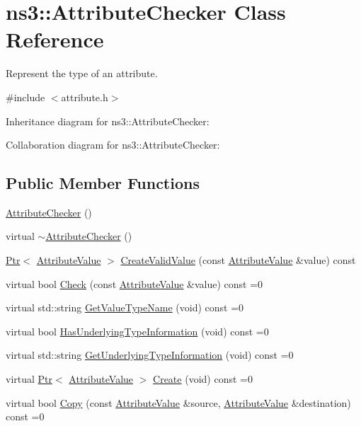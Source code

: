 \hypertarget{classns3_1_1AttributeChecker}{}\section{ns3\+:\+:Attribute\+Checker Class Reference}
\label{classns3_1_1AttributeChecker}


Represent the type of an attribute.  




{\ttfamily \#include $<$attribute.\+h$>$}



Inheritance diagram for ns3\+:\+:Attribute\+Checker\+:


Collaboration diagram for ns3\+:\+:Attribute\+Checker\+:
\subsection*{Public Member Functions}
\begin{DoxyCompactItemize}
\item 
\hyperlink{classns3_1_1AttributeChecker_a97098b5a79de286e4fd4a5c25f44f5d7}{Attribute\+Checker} ()
\item 
virtual \hyperlink{classns3_1_1AttributeChecker_a259eb24493c7a0407399c1a8689add99}{$\sim$\+Attribute\+Checker} ()
\item 
\hyperlink{classns3_1_1Ptr}{Ptr}$<$ \hyperlink{classns3_1_1AttributeValue}{Attribute\+Value} $>$ \hyperlink{classns3_1_1AttributeChecker_a654855a7039de682a77ce794bc6a4f6a}{Create\+Valid\+Value} (const \hyperlink{classns3_1_1AttributeValue}{Attribute\+Value} \&value) const 
\item 
virtual bool \hyperlink{classns3_1_1AttributeChecker_a3b0cdc0ac70282a7762605181439dfe4}{Check} (const \hyperlink{classns3_1_1AttributeValue}{Attribute\+Value} \&value) const =0
\item 
virtual std\+::string \hyperlink{classns3_1_1AttributeChecker_ae2a0d51af0c8ac143b7c8e942d6a2951}{Get\+Value\+Type\+Name} (void) const =0
\item 
virtual bool \hyperlink{classns3_1_1AttributeChecker_a6e8d7ecc2e7d133904a537216a33ab4c}{Has\+Underlying\+Type\+Information} (void) const =0
\item 
virtual std\+::string \hyperlink{classns3_1_1AttributeChecker_a1a96c171455980fb9ec4402c44923a18}{Get\+Underlying\+Type\+Information} (void) const =0
\item 
virtual \hyperlink{classns3_1_1Ptr}{Ptr}$<$ \hyperlink{classns3_1_1AttributeValue}{Attribute\+Value} $>$ \hyperlink{classns3_1_1AttributeChecker_a034af3ccac738b21e0d62e4191c241de}{Create} (void) const =0
\item 
virtual bool \hyperlink{classns3_1_1AttributeChecker_a6958892aff107ac5ad9feb1d0c2728dd}{Copy} (const \hyperlink{classns3_1_1AttributeValue}{Attribute\+Value} \&source, \hyperlink{classns3_1_1AttributeValue}{Attribute\+Value} \&destination) const =0
\end{DoxyCompactItemize}
